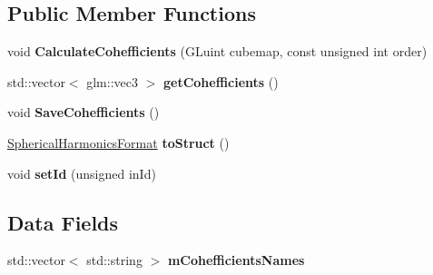 \subsection*{Public Member Functions}
\begin{DoxyCompactItemize}
\item 
void {\bfseries Calculate\+Cohefficients} (G\+Luint cubemap, const unsigned int order)\hypertarget{class_spherical_harmonics_af176027a0be4a86c43525233fbd718e2}{}\label{class_spherical_harmonics_af176027a0be4a86c43525233fbd718e2}

\item 
std\+::vector$<$ glm\+::vec3 $>$ {\bfseries get\+Cohefficients} ()\hypertarget{class_spherical_harmonics_a5af84553c1069647786569dff9adc89b}{}\label{class_spherical_harmonics_a5af84553c1069647786569dff9adc89b}

\item 
void {\bfseries Save\+Cohefficients} ()\hypertarget{class_spherical_harmonics_a191f166157005955120126331a5aa95b}{}\label{class_spherical_harmonics_a191f166157005955120126331a5aa95b}

\item 
\hyperlink{struct_spherical_harmonics_1_1_spherical_harmonics_format}{Spherical\+Harmonics\+Format} {\bfseries to\+Struct} ()\hypertarget{class_spherical_harmonics_a394583d89e2ca18f17b55396d5abe14b}{}\label{class_spherical_harmonics_a394583d89e2ca18f17b55396d5abe14b}

\item 
void {\bfseries set\+Id} (unsigned in\+Id)\hypertarget{class_spherical_harmonics_ac2707c28fdba92e8f4fecc0e54fc48b2}{}\label{class_spherical_harmonics_ac2707c28fdba92e8f4fecc0e54fc48b2}

\end{DoxyCompactItemize}
\subsection*{Data Fields}
\begin{DoxyCompactItemize}
\item 
std\+::vector$<$ std\+::string $>$ {\bfseries m\+Cohefficients\+Names}\hypertarget{class_spherical_harmonics_ae720cd6bd4d4f7372d794a466f64b061}{}\label{class_spherical_harmonics_ae720cd6bd4d4f7372d794a466f64b061}

\end{DoxyCompactItemize}
